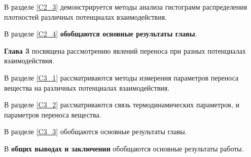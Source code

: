 В разделе \ref{C2_3} демонстрируется методы анализа гистограмм распределения плотностей различных потенциалах взаимодействия.

В разделе \ref{C2_4} \textbf{обобщаются основные результаты главы}.

\textbf{Глава 3} посвящена рассмотрению явлений переноса при разных потенциалах взаимодействия.

В разделе \ref{C3_1} рассматриваются методы измерения параметров переноса вещества на различных потенциалах взаимодействия.

В разделе \ref{C3_2} рассматриваются связь термодинамических параметров, и параметров переноса вещества.

В разделе \ref{C3_3} обобщаются основные результаты главы.

В \textbf{общих выводах и заключении} обобщаются основные результаты работы.

